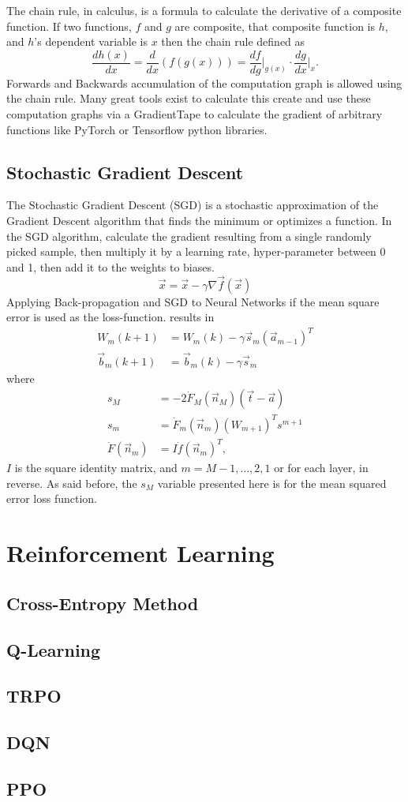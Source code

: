 \documentclass{article}
\begin{document}
The chain rule, in calculus, is a formula to calculate the derivative of a composite function. If two functions, $f$ and $g$ are composite, that composite function is $h$, and $h$'s dependent variable is $x$ then the chain rule defined as 
$$\frac{dh(x)}{dx}=\frac{d}{dx}(f(g(x)))=\frac{df}{dg}\bigg|_{g(x)}\cdot\frac{dg}{dx}\bigg|_{x}.$$ Forwards and Backwards accumulation of the computation graph is allowed using the chain rule. Many great tools exist to calculate this create and use these computation graphs via a GradientTape to calculate the gradient of arbitrary functions like PyTorch or Tensorflow python libraries.

\subsection{Stochastic Gradient Descent}

The Stochastic Gradient Descent (SGD) is a stochastic approximation of the Gradient Descent algorithm that finds the minimum or optimizes a function. In the SGD algorithm, calculate the gradient resulting from a single randomly picked sample, then multiply it by a learning rate, hyper-parameter between 0 and 1, then add it to the weights to biases. $$\vec{x}=\vec{x}-\gamma\nabla \vec{f}(\vec{x})$$ Applying Back-propagation and SGD to Neural Networks if the mean square error is used as the loss-function. results in 
\begin{align*}
W_{m}(k+1)&=W_{m}(k)-\gamma \vec{s}_m (\vec{a}_{m-1})^T\\
\vec{b}_m(k+1)&=\vec{b}_{m}(k)-\gamma \vec{s}_m
\end{align*} where
\begin{align*}
s_{M}&=-2\dot{F}_M(\vec{n}_M)(\vec{t}-\vec{a})\\
s_m&=\dot{F}_m(\vec{n}_m)(W_{m+1})^T s^{m+1}\\
\dot{F}(\vec{n}_m)&=I\dot{f}(\vec{n}_m)^T,
\end{align*} $I$ is the square identity matrix, and $m=M-1,\dots, 2, 1$ or for each layer, in reverse. As said before, the $s_M$ variable presented here is for the mean squared error loss function.

\section{Reinforcement Learning}

\subsection{Cross-Entropy Method}

\subsection{Q-Learning}

\subsection{TRPO}

\subsection{DQN}

\subsection{PPO}
\end{document}
